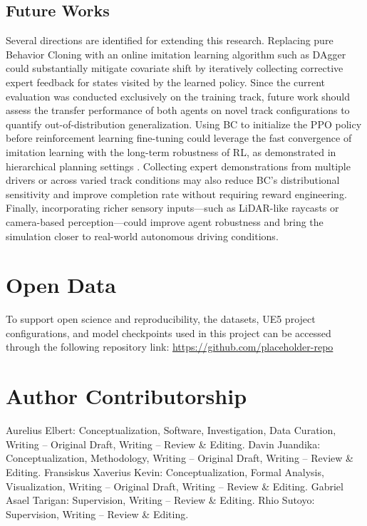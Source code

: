 \documentclass[conference]{IEEEtran}
\begin{document}
\subsection{Future Works}

Several directions are identified for extending this research. Replacing pure Behavior Cloning with an online imitation learning algorithm such as DAgger \cite{ross2011reduction} could substantially mitigate covariate shift by iteratively collecting corrective expert feedback for states visited by the learned policy. Since the current evaluation was conducted exclusively on the training track, future work should assess the transfer performance of both agents on novel track configurations to quantify out-of-distribution generalization. Using BC to initialize the PPO policy before reinforcement learning fine-tuning could leverage the fast convergence of imitation learning with the long-term robustness of RL, as demonstrated in hierarchical planning settings \cite{bronstein2022hierarchical}. Collecting expert demonstrations from multiple drivers or across varied track conditions may also reduce BC's distributional sensitivity and improve completion rate without requiring reward engineering. Finally, incorporating richer sensory inputs---such as LiDAR-like raycasts or camera-based perception---could improve agent robustness and bring the simulation closer to real-world autonomous driving conditions.

\section{Open Data}
To support open science and reproducibility, the datasets, UE5 project configurations, and model checkpoints used in this project can be accessed through the following repository link: \url{https://github.com/placeholder-repo}

\section{Author Contributorship}
Aurelius Elbert: Conceptualization, Software, Investigation, Data Curation, Writing -- Original Draft, Writing -- Review \& Editing.
Davin Juandika: Conceptualization, Methodology, Writing -- Original Draft, Writing -- Review \& Editing.
Fransiskus Xaverius Kevin: Conceptualization, Formal Analysis, Visualization, Writing -- Original Draft, Writing -- Review \& Editing.
Gabriel Asael Tarigan: Supervision, Writing -- Review \& Editing.
Rhio Sutoyo: Supervision, Writing -- Review \& Editing.
\end{document}
